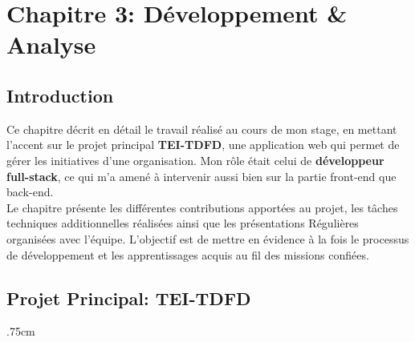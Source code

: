 \chapter*{Chapitre 3: Développement \& Analyse}

\section{Introduction}
Ce chapitre décrit en détail le travail réalisé au cours de mon stage, en mettant l'accent sur le projet principal \textbf{TEI-TDFD}, une application web qui permet de gérer les initiatives d'une organisation.
Mon rôle était celui de \textbf{développeur full-stack}, ce qui m'a amené à intervenir aussi bien sur la partie front-end que back-end.\\[2mm]
Le chapitre présente les différentes contributions apportées au projet, les tâches techniques additionnelles réalisées ainsi que les présentations Régulières organisées avec l'équipe. 
L'objectif est de mettre en évidence à la fois le processus de développement et les apprentissages acquis au fil des missions confiées.


\section{Projet Principal: TEI-TDFD}
\leftskip.75cm
